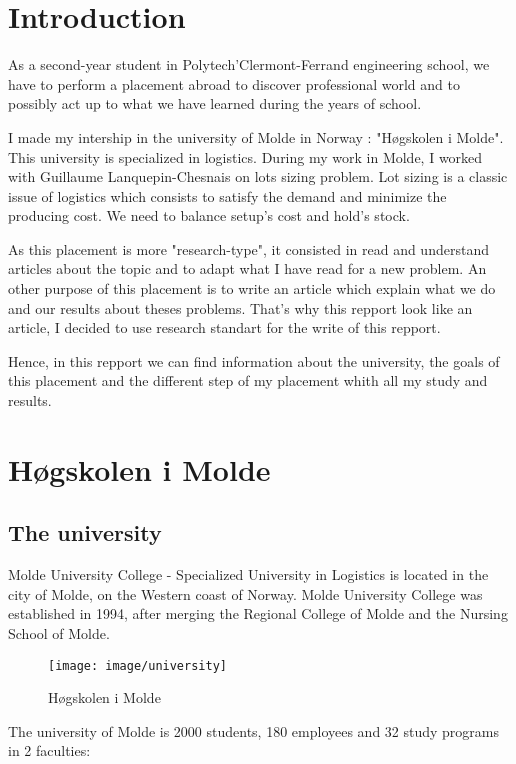 \section*{Introduction}

As a second-year student in Polytech’Clermont-Ferrand engineering school, we have to perform a placement abroad to discover professional world and to possibly act up to what we have learned during the years of school. 

I made my intership in the university of Molde in Norway : "Høgskolen i Molde". This university is specialized in logistics. During my work in Molde, I worked with Guillaume Lanquepin-Chesnais on lots sizing problem. Lot sizing is a classic issue of logistics which consists to satisfy the demand 
and minimize the producing cost. We need to balance setup's cost and hold's stock.

As this placement is more "research-type", it consisted in read and understand articles about the topic and to adapt what I have read for a new problem.
An other purpose of this placement is to write an article which explain what we do and our results about theses problems. That's why this repport look like an article, I decided to use research standart for the write of this repport.

Hence, in this repport we can find information about the university, the goals of this placement and the different step of my placement whith all my study and results.
\newpage
\section{Høgskolen i Molde} 

\subsection{The university}

Molde University College - Specialized University in Logistics is located in the city of Molde, on the Western coast of Norway.  Molde University College  was established in 1994, after merging the Regional College of Molde and the Nursing School of Molde.

\begin{figure}[H]
\texttt{[image: image/university]}
\centering
\caption{Høgskolen i Molde}
\end{figure}

The university of Molde is 2000 students, 180 employees and 32 study programs in 2 faculties:


